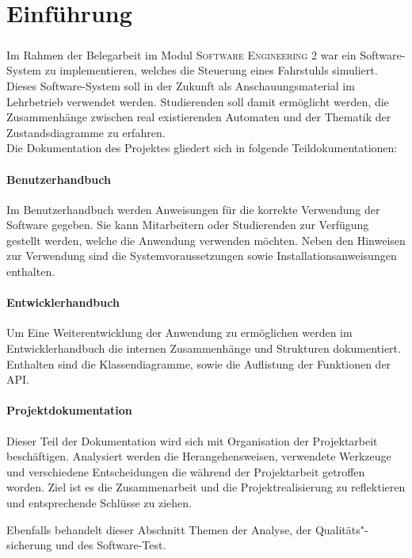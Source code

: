 \chapter{Einführung}
\paragraph{}
Im Rahmen der Belegarbeit im Modul \textsc{Software Engineering 2} war ein Software-System zu implementieren, welches die Steuerung eines Fahrstuhls simuliert. Dieses Software-System soll in der Zukunft als Anschauungsmaterial im Lehrbetrieb verwendet werden. Studierenden soll damit ermöglicht werden, die Zusammenhänge zwischen real existierenden Automaten und der Thematik der Zustandsdiagramme zu erfahren.
\\
Die Dokumentation des Projektes gliedert sich in folgende Teildokumentationen:
\subsubsection*{Benutzerhandbuch}
Im Benutzerhandbuch werden Anweisungen für die korrekte Verwendung der Software gegeben. Sie kann Mitarbeitern oder Studierenden zur Verfügung gestellt werden, welche die Anwendung verwenden möchten. Neben den Hinweisen zur Verwendung sind die Systemvoraussetzungen sowie Installationsanweisungen enthalten.

\subsubsection*{Entwicklerhandbuch}
Um Eine Weiterentwicklung der Anwendung zu ermöglichen werden im Entwicklerhandbuch die internen Zusammenhänge und Strukturen dokumentiert. Enthalten sind die Klassendiagramme, sowie die Auflistung der Funktionen der \gls{API}.\\

\subsubsection*{Projektdokumentation}
Dieser Teil der Dokumentation wird sich mit Organisation der Projektarbeit beschäftigen. Analysiert werden die Herangehensweisen, verwendete Werkzeuge und verschiedene Entscheidungen die während der Projektarbeit getroffen worden. Ziel ist es die Zusammenarbeit und die Projektrealisierung zu reflektieren und entsprechende Schlüsse zu ziehen.

Ebenfalls behandelt dieser Abschnitt Themen der Analyse, der Qualitäts"-sicherung und des Software-Test.

